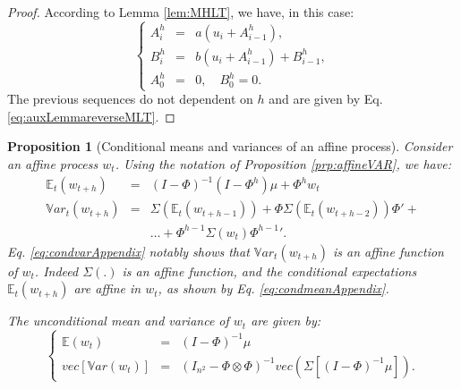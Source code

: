 \documentclass[
  12pt,
]{book}
\newtheorem{proposition}{Proposition}[chapter]
\theoremstyle{definition}
\theoremstyle{definition}
\theoremstyle{definition}
\theoremstyle{definition}
\theoremstyle{remark}
\begin{document}
\begin{proof}
According to Lemma \ref{lem:MHLT}, we have, in this case:
\[
\left\{
\begin{array}{ccl}
A^h_{i} &=& a(u_{i} + A^h_{i-1}), \\
B^h_{i} &=& b(u_{i} + A^h_{i-1}) + B^h_{i-1}, \\
A^h_{0} &=& 0, \quad B^h_{0} = 0.
\end{array}
\right.
\]
The previous sequences do not dependent on \(h\) and are given by Eq. \eqref{eq:auxLemmareverseMLT}.
\end{proof}

\begin{proposition}[Conditional means and variances of an affine process]
\protect\hypertarget{prp:condvarAffine}{}\label{prp:condvarAffine}Consider an affine process \(w_t\). Using the notation of Proposition \ref{prp:affineVAR}, we have:
\begin{eqnarray}
\mathbb{E}_t(w_{t+h}) &=& (I - \Phi)^{-1}(I - \Phi^h)\mu + \Phi^h w_t \label{eq:condmeanAppendix}\\
\mathbb{V}ar_t(w_{t+h}) &=& \Sigma(\mathbb{E}_t(w_{t+h-1}))+\Phi \Sigma(\mathbb{E}_t(w_{t+h-2}))\Phi' + \nonumber \\
&& \dots + \Phi^{h-1} \Sigma(w_{t}){\Phi^{h-1}}'. \label{eq:condvarAppendix}
\end{eqnarray}
Eq. \eqref{eq:condvarAppendix} notably shows that \(\mathbb{V}ar_t(w_{t+h})\) is an affine function of \(w_t\). Indeed \(\Sigma(.)\) is an affine function, and the conditional expectations \(\mathbb{E}_t(w_{t+h})\) are affine in \(w_t\), as shown by Eq. \eqref{eq:condmeanAppendix}.

The unconditional mean and variance of \(w_t\) are given by:
\begin{equation}
\left\{
\begin{array}{ccl}
\mathbb{E}(w_t) &=& (I - \Phi)^{-1}\mu\\
vec[\mathbb{V}ar(w_t)] &=& (I_{n^2} - \Phi \otimes \Phi)^{-1} vec\left(\Sigma[(I - \Phi)^{-1}\mu]\right).
\end{array}
\right.\label{eq:uncondmeanvarAppendix}
\end{equation}
\end{proposition}
\end{document}
